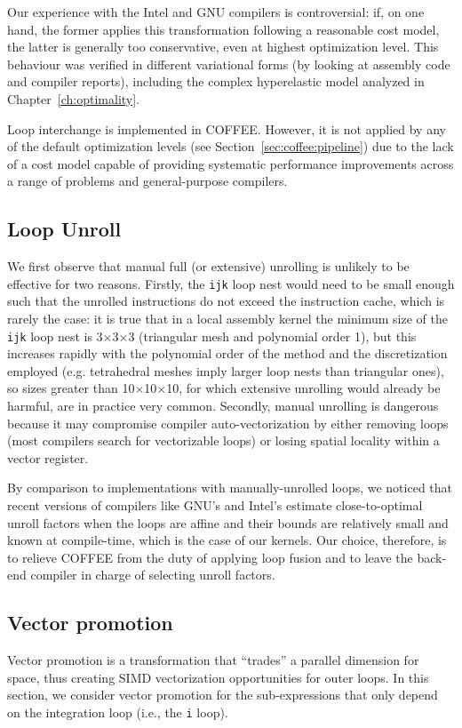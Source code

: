 Our experience with the Intel and GNU compilers is controversial: if, on one hand, the former applies this transformation following a reasonable cost model, the latter is generally too conservative, even at highest optimization level. This behaviour was verified in different variational forms (by looking at assembly code and compiler reports), including the complex hyperelastic model analyzed in Chapter~\ref{ch:optimality}. 

Loop interchange is implemented in COFFEE. However, it is not applied by any of the default optimization levels (see Section~\ref{sec:coffee:pipeline}) due to the lack of a cost model capable of providing systematic performance improvements across a range of problems and general-purpose compilers.  

\subsection{Loop Unroll}
We first observe that manual full (or extensive) unrolling is unlikely to be effective for two reasons. Firstly, the \texttt{ijk} loop nest would need to be small enough such that the unrolled instructions do not exceed the instruction cache, which is rarely the case: it is true that in a local assembly kernel the minimum size of the \texttt{ijk} loop nest is 3$\times$3$\times$3 (triangular mesh and polynomial order 1), but this increases rapidly with the polynomial order of the method and the discretization employed (e.g. tetrahedral meshes imply larger loop nests than triangular ones), so sizes greater than 10$\times$10$\times$10, for which extensive unrolling would already be harmful, are in practice very common. Secondly, manual unrolling is dangerous because it may compromise compiler auto-vectorization by either removing loops (most compilers search for vectorizable loops) or losing spatial locality within a vector register.

By comparison to implementations with manually-unrolled loops, we noticed that recent versions of compilers like GNU's and Intel's estimate close-to-optimal unroll factors when the loops are affine and their bounds are relatively small and known at compile-time, which is the case of our kernels. Our choice, therefore, is to relieve COFFEE from the duty of applying loop fusion and to leave the back-end compiler in charge of selecting unroll factors.

\subsection{Vector promotion}
\label{sec:coffee-precompute}
Vector promotion is a transformation that ``trades'' a parallel dimension for space, thus creating SIMD vectorization opportunities for outer loops. In this section, we consider vector promotion for the sub-expressions that only depend on the integration loop (i.e., the {\tt i} loop). 

